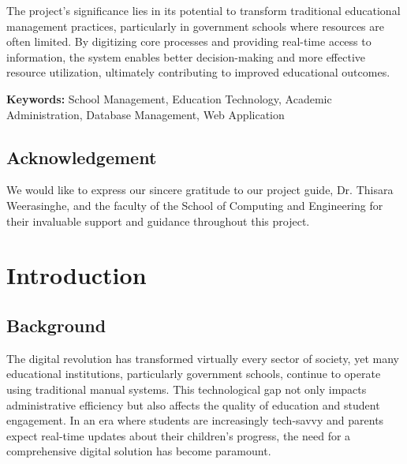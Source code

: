 \documentclass[12pt,a4paper]{report}
\begin{document}
The project's significance lies in its potential to transform traditional educational management practices, particularly in government schools where resources are often limited. By digitizing core processes and providing real-time access to information, the system enables better decision-making and more effective resource utilization, ultimately contributing to improved educational outcomes.

\textbf{Keywords:} School Management, Education Technology, Academic Administration, Database Management, Web Application

\newpage
\section*{Acknowledgement}
We would like to express our sincere gratitude to our project guide, Dr. Thisara Weerasinghe, and the faculty of the School of Computing and Engineering for their invaluable support and guidance throughout this project.

\newpage
\tableofcontents

\newpage
\listoffigures

\newpage
\listoftables

\newpage
\renewcommand{\thepage}{\arabic{page}} %
\setcounter{page}{1}

\chapter{Introduction}
\section{Background}
The digital revolution has transformed virtually every sector of society, yet many educational institutions, particularly government schools, continue to operate using traditional manual systems. This technological gap not only impacts administrative efficiency but also affects the quality of education and student engagement. In an era where students are increasingly tech-savvy and parents expect real-time updates about their children's progress, the need for a comprehensive digital solution has become paramount.
\end{document}
